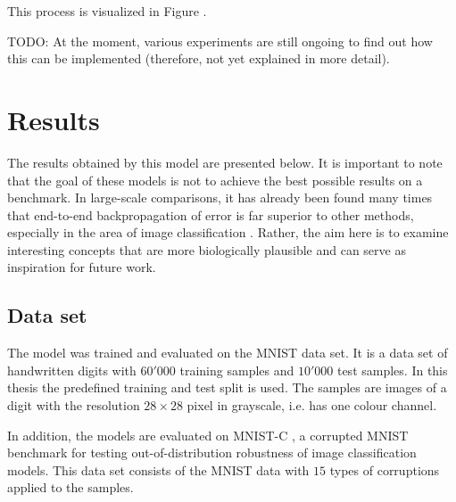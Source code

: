 This process is visualized in Figure . 


TODO: At the moment, various experiments are still ongoing to find out how this can be implemented (therefore, not yet explained in more detail).





\section{Results}
The results obtained by this model are presented below. It is important to note that the goal of these models is not to achieve the best possible results on a benchmark. In large-scale comparisons, it has already been found many times that end-to-end backpropagation of error is far superior to other methods, especially in the area of image classification . Rather, the aim here is to examine interesting concepts that are more biologically plausible and can serve as inspiration for future work.

\subsection{Data set}
The model was trained and evaluated on the MNIST data set. It is a data set of handwritten digits with $60'000$ training samples and $10'000$ test samples.
In this thesis the predefined training and test split is used.
The samples are images of a digit with the resolution $28 \times 28$ pixel in grayscale, i.e. has one colour channel.

In addition, the models are evaluated on MNIST-C , a corrupted MNIST benchmark for testing out-of-distribution robustness of image classification models. This data set consists of the MNIST data with $15$ types of corruptions applied to the samples.

